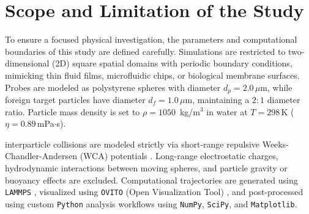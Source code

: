 \section{Scope and Limitation of the Study}
\label{sec:1.6}
\hspace{\parindent} To ensure a focused physical investigation, the parameters and computational boundaries of this study are defined carefully. Simulations are restricted to two-dimensional (2D) square spatial domains with periodic boundary conditions, mimicking thin fluid films, microfluidic chips, or biological membrane surfaces. Probes are modeled as polystyrene spheres with diameter $d_p = 2.0 \,\mu$m, while foreign target particles have diameter $d_f = 1.0\,\mu$m, maintaining a $2:1$ diameter ratio. Particle mass density is set to $\rho = 1050$ \,kg/m$^3$ in water at $T = 298\,$K ($\eta = 0.89\,$mPa$\cdot$s).

\hspace{\parindent} interparticle collisions are modeled strictly via short-range repulsive Weeks-Chandler-Andersen (WCA) potentials \cite{Weeks1971}. Long-range electrostatic charges, hydrodynamic interactions between moving spheres, and particle gravity or buoyancy effects are excluded. Computational trajectories are generated using \texttt{LAMMPS} \cite{Thompson2022}, visualized using \texttt{OVITO} (Open Visualization Tool) \cite{Stukowski2010}, and post-processed using custom \texttt{Python} analysis workflows using \texttt{NumPy}, \texttt{SciPy}, and \texttt{Matplotlib}.